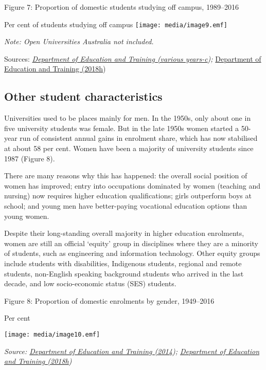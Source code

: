 \documentclass[]{book}
\begin{document}
\protect\hypertarget{_Ref521520607}{}{}Figure 7: Proportion of domestic students studying off campus, 1989--2016

Per cent of students studying off campus \texttt{[image: media/image9.emf]}

\emph{Note: Open Universities Australia not included. }

Sources: \emph{\protect\hyperlink{_ENREF_114}{Department of Education and Training (various years-c});} \protect\hyperlink{_ENREF_87}{Department of Education and Training (2018h})

\hypertarget{other-student-characteristics}{%
\subsection{Other student characteristics }\label{other-student-characteristics}}

Universities used to be places mainly for men. In the 1950s, only about one in five university students was female. But in the late 1950s women started a 50-year run of consistent annual gains in enrolment share, which has now stabilised at about 58 per cent. Women have been a majority of university students since 1987 (Figure 8).

There are many reasons why this has happened: the overall social position of women has improved; entry into occupations dominated by women (teaching and nursing) now requires higher education qualifications; girls outperform boys at school; and young men have better-paying vocational education options than young women.

Despite their long-standing overall majority in higher education enrolments, women are still an official `equity' group in disciplines where they are a minority of students, such as engineering and information technology. Other equity groups include students with disabilities, Indigenous students, regional and remote students, non-English speaking background students who arrived in the last decade, and low socio-economic status (SES) students.

\protect\hypertarget{_Ref521520895}{}{}Figure 8: Proportion of domestic enrolments by gender, 1949--2016

Per cent

\texttt{[image: media/image10.emf]}

\emph{Source: \protect\hyperlink{_ENREF_60}{Department of Education and Training (2014}); \protect\hyperlink{_ENREF_87}{Department of Education and Training (2018h})}
\end{document}

